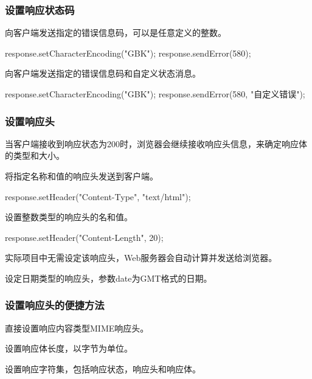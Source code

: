 \begin{frame}[fragile] %
\frametitle{设置响应状态码} 


向客户端发送指定的错误信息码，可以是任意定义的整数。

\begin{javaCode}
response.setCharacterEncoding("GBK");
response.sendError(580); 
\end{javaCode}


向客户端发送指定的错误信息码和自定义状态消息。

\begin{javaCode}
response.setCharacterEncoding("GBK");
response.sendError(580, "自定义错误"); 
\end{javaCode}
\end{frame}

\begin{frame}[fragile] %
\frametitle{设置响应头} 

{\hei 当客户端接收到响应状态为200时，浏览器会继续接收响应头信息，来确定响应体的类型和大小。}


将指定名称和值的响应头发送到客户端。
\begin{javaCode}
response.setHeader("Content-Type", "text/html");  
\end{javaCode}


设置整数类型的响应头的名和值。 
\begin{javaCode}
response.setHeader("Content-Length", 20);  
\end{javaCode}
{\kai 实际项目中无需设定该响应头，Web服务器会自动计算并发送给浏览器。}


设定日期类型的响应头，参数date为GMT格式的日期。
\end{frame}

\begin{frame}[fragile] %
\frametitle{设置响应头的便捷方法} 


直接设置响应内容类型MIME响应头。


设置响应体长度，以字节为单位。


设置响应字符集，包括响应状态，响应头和响应体。 
\end{frame}

